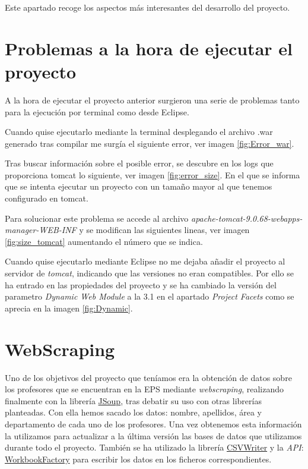 
Este apartado recoge los aspectos más interesantes del desarrollo del proyecto.

\section{Problemas a la hora de ejecutar el proyecto}

A la hora de ejecutar el proyecto anterior surgieron una serie de problemas tanto para la ejecución por terminal como desde Eclipse.

Cuando quise ejecutarlo mediante la terminal desplegando el archivo .war generado tras compilar me surgía el siguiente error, ver imagen \ref{fig:Error_war}.


Tras buscar información sobre el posible error, se descubre en los logs que proporciona tomcat lo siguiente, ver imagen \ref{fig:error_size}. En el que se informa que se intenta ejecutar un proyecto con un tamaño mayor al que tenemos configurado en tomcat.


Para solucionar este problema se accede al archivo \emph{apache-tomcat-9.0.68-webapps-manager-WEB-INF} y se modifican las siguientes lineas, ver imagen \ref{fig:size_tomcat} aumentando el número que se indica.


Cuando quise ejecutarlo mediante Eclipse no me dejaba añadir el proyecto al servidor de \emph{tomcat}, indicando que las versiones no eran compatibles. Por ello se ha entrado en las propiedades del proyecto y se ha cambiado la versión del parametro \emph{Dynamic Web Module} a la 3.1 en el apartado \emph{Project Facets} como se aprecia en la imagen \ref{fig:Dynamic}.


\section{WebScraping}

Uno de los objetivos del proyecto que teníamos era la obtención de datos sobre los profesores que se encuentran en la EPS mediante \emph{webscraping}, realizando finalmente con la librería \href{https://jsoup.org/}{JSoup}, tras debatir su uso con otras librerías planteadas. 
Con ella hemos sacado los datos: nombre, apellidos, área y departamento de cada uno de los profesores. Una vez obtenemos esta información la utilizamos para actualizar a la última versión las bases de datos que utilizamos durante todo el proyecto.
También se ha utilizado la librería \href{https://opencsv.sourceforge.net/apidocs/com/opencsv/CSVWriter.html}{CSVWriter} y la \emph{API}: \href{https://poi.apache.org/apidocs/dev/org/apache/poi/ss/usermodel/WorkbookFactory.html}{WorkbookFactory} para escribir los datos en los ficheros correspondientes.

